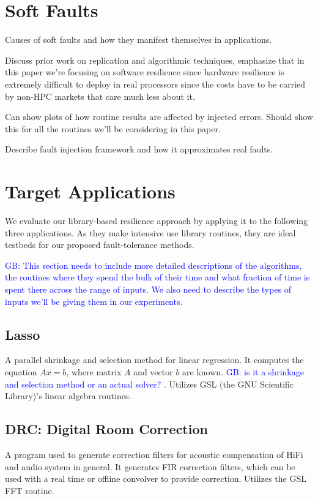 \documentclass[prodmode,acmtecs]{acmconf} %
\newcommand{\greg}[1]{%
  \textcolor{blue}{GB: #1}
}
\begin{document}
\section{Soft Faults}
\label{sec:soft_faults}

Causes of soft faults and how they manifest themselves in applications.

Discuss prior work on replication and algorithmic techniques, emphasize that in this paper we're focusing on software resilience since hardware resilience is extremely difficult to deploy in real processors since the costs have to be carried by non-HPC markets that care much less about it.

Can show plots of how routine results are affected by injected errors. Should show this for all the routines we'll be considering in this paper.

Describe fault injection framework and how it approximates real faults.

\section{Target Applications}
\label{sec:apps}

We evaluate our library-based resilience approach by applying it to the following three applications.
As they make intensive use library routines, they are ideal testbeds for our proposed fault-tolerance methods.

\greg{This section needs to include more detailed descriptions of the algorithms, the routines where they spend the bulk of their time and what fraction of time is spent there across the range of inputs. We also need to describe the types of inputs we'll be giving them in our experiments.}
\subsection{Lasso}
\label{sec:apps:lasso}
A parallel shrinkage and selection method for linear regression. It computes the equation $Ax=b$, where matrix $A$ and vector $b$ are known. \greg{is it a shrinkage and selection method or an actual solver?}. Utilizes GSL (the GNU Scientific Library)'s linear algebra routines.

\subsection{DRC: Digital Room Correction}
\label{sec:apps:drc}

A program used to generate correction filters for acoustic compensation of HiFi and audio system in general. It generates FIR correction filters, which can be used with a real time or offline convolver to provide correction. Utilizes the GSL FFT routine.
\end{document}
